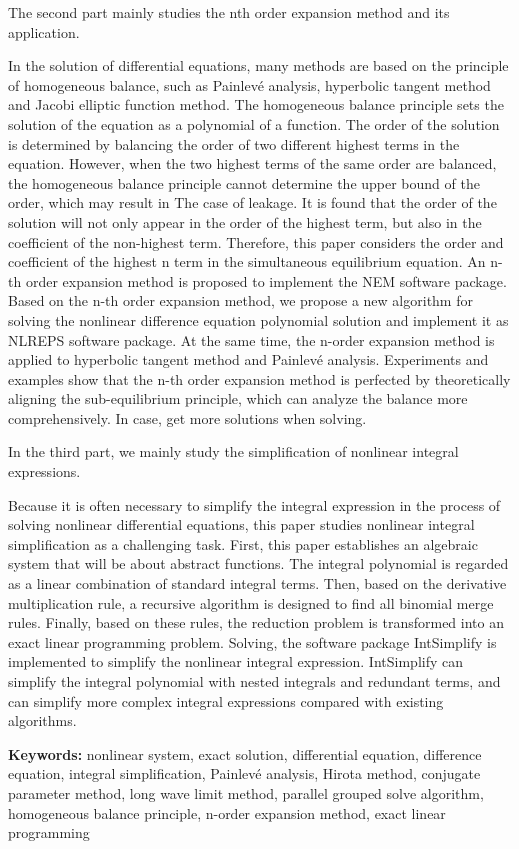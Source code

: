 The second part mainly studies the nth order expansion method and its application.

In the solution of differential equations, many methods are based on the principle of homogeneous balance, such as Painlevé analysis, hyperbolic tangent method and Jacobi elliptic function method. The homogeneous balance principle sets the solution of the equation as a polynomial of a function. The order of the solution is determined by balancing the order of two different highest terms in the equation. However, when the two highest terms of the same order are balanced, the homogeneous balance principle cannot determine the upper bound of the order, which may result in The case of leakage. It is found that the order of the solution will not only appear in the order of the highest term, but also in the coefficient of the non-highest term. Therefore, this paper considers the order and coefficient of the highest n term in the simultaneous equilibrium equation. An n-th order expansion method is proposed to implement the NEM software package. Based on the n-th order expansion method, we propose a new algorithm for solving the nonlinear difference equation polynomial solution and implement it as NLREPS software package. At the same time, the n-order expansion method is applied to hyperbolic tangent method and Painlevé analysis. Experiments and examples show that the n-th order expansion method is perfected by theoretically aligning the sub-equilibrium principle, which can analyze the balance more comprehensively. In case, get more solutions when solving.

In the third part, we mainly study the simplification of nonlinear integral expressions.

Because it is often necessary to simplify the integral expression in the process of solving nonlinear differential equations, this paper studies nonlinear integral simplification as a challenging task. First, this paper establishes an algebraic system that will be about abstract functions. The integral polynomial is regarded as a linear combination of standard integral terms. Then, based on the derivative multiplication rule, a recursive algorithm is designed to find all binomial merge rules. Finally, based on these rules, the reduction problem is transformed into an exact linear programming problem. Solving, the software package IntSimplify is implemented to simplify the nonlinear integral expression. IntSimplify can simplify the integral polynomial with nested integrals and redundant terms, and can simplify more complex integral expressions compared with existing algorithms.

\bigskip
\noindent\textbf{ Keywords:}
nonlinear system, exact solution, differential equation, difference equation, integral simplification, Painlevé analysis, Hirota method, conjugate parameter method, long wave limit method, parallel grouped solve algorithm, homogeneous balance principle, n-order expansion method, exact linear programming
